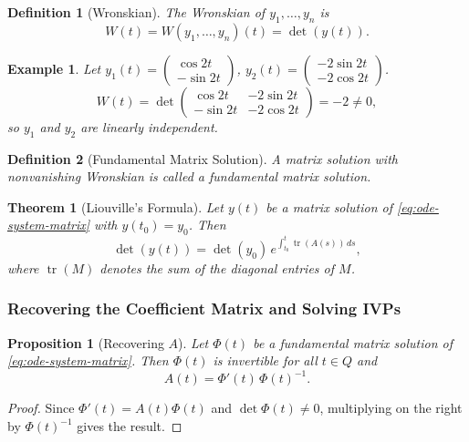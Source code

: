 \documentclass{article}
\newtheorem{theorem}{Theorem}
\newtheorem{definition}{Definition}
\newtheorem*{example}{Example}
\newtheorem{proposition}{Proposition}
\begin{document}
\begin{definition}[Wronskian]
    The Wronskian of $y_1,\ldots,y_n$ is
    \[W(t) = W(y_1,\ldots,y_n)(t) = \det(y(t)).\]
\end{definition}

\begin{example}
    Let $y_1(t) = \begin{pmatrix}\cos 2t\\-\sin 2t\end{pmatrix}$, 
    $y_2(t) = \begin{pmatrix}-2\sin 2t\\-2\cos 2t\end{pmatrix}$.
    \[W(t) = \det\begin{pmatrix}\cos 2t & -2\sin 2t\\
    -\sin 2t & -2\cos 2t\end{pmatrix} = -2 \neq 0,\]
    so $y_1$ and $y_2$ are linearly independent.
\end{example}

\begin{definition}[Fundamental Matrix Solution]
    A matrix solution with nonvanishing Wronskian is called a 
    \emph{fundamental matrix solution}.
\end{definition}

\begin{theorem}[Liouville's Formula]
    Let $y(t)$ be a matrix solution of \eqref{eq:ode-system-matrix} 
    with $y(t_0) = y_0$. Then
    \[\det(y(t)) = \det(y_0)\,e^{\int_{t_0}^t \operatorname{tr}
    (A(s))\,ds},\]
    where $\operatorname{tr}(M)$ denotes the sum of the diagonal 
    entries of $M$.
\end{theorem}

\subsubsection{Recovering the Coefficient Matrix and Solving IVPs}

\begin{proposition}[Recovering $A$]
    \label{prop:recover-A}
    Let $\Phi(t)$ be a fundamental matrix solution of 
    \eqref{eq:ode-system-matrix}. Then $\Phi(t)$ is invertible for 
    all $t \in Q$ and
    \[A(t) = \Phi'(t)\,\Phi(t)^{-1}.\]
\end{proposition}

\begin{proof}
    Since $\Phi'(t) = A(t)\Phi(t)$ and $\det\Phi(t) \neq 0$, 
    multiplying on the right by $\Phi(t)^{-1}$ gives the result.
\end{proof}
\end{document}
